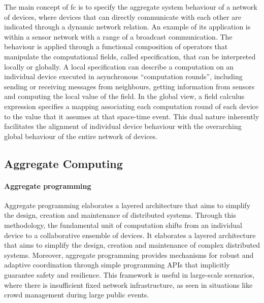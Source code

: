 The main concept of \ac{fc} is to specify the aggregate system behaviour of a network of devices, where devices that can
directly communicate with each other are indicated through a dynamic network relation.
An example of its application is within a sensor network with a range of a broadcast communication.
The behaviour is applied through a functional composition of operators that manipulate the computational fields,
called specification, that can be interpreted locally or globally.
A local specification can describe a computation on an individual device executed in asynchronous ``computation rounds'',
including sending or receiving messages from neighbours, getting information from sensors and computing the local value of the field.
In the global view, a field calculus expression specifies a mapping associating each computation round of each device to
the value that it assumes at that space-time event.
This dual nature inherently facilitates the alignment of individual device behaviour with the overarching global behaviour
of the entire network of devices.

\subsection{Aggregate Computing}
\label{subsec:aggregate-computing}

\paragraph{Aggregate programming}
Aggregate programming elaborates a layered architecture that aims to simplify the design, creation and maintenance of
distributed systems.
Through this methodology, the fundamental unit of computation shifts from an individual device to a collaborative
ensemble of devices.
It elaborates a layered architecture that aims to simplify the design, creation and maintenance of complex distributed
systems.
Moreover, aggregate programming provides mechanisms for robust and adaptive coordination through simple programming APIs
that implicitly guarantee safety and resilience.
This framework is useful in large-scale scenarios, where there is insufficient fixed network infrastructure, as seen in
situations like crowd management during large public events.

